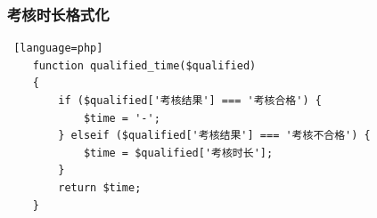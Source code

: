 \documentclass[winfonts,UTF8,a4paper]{ctexart}
\begin{document}
\subsubsection*{考核时长格式化}
\begin{lstlisting} [language=php]
	function qualified_time($qualified)
	{
		if ($qualified['考核结果'] === '考核合格') {
			$time = '-';
		} elseif ($qualified['考核结果'] === '考核不合格') {
			$time = $qualified['考核时长'];
		}
		return $time;
	}
\end{lstlisting}

\newpage


    
    
\end{document}
